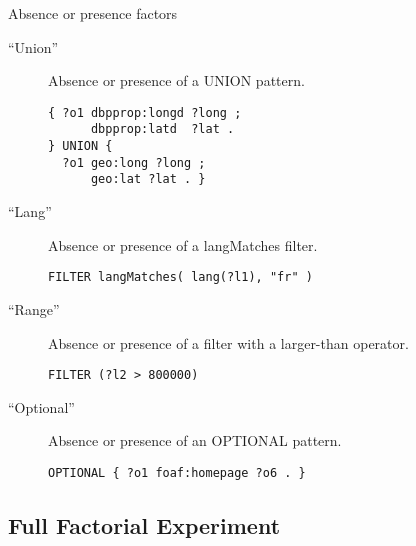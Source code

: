 \documentclass[english,handout,aspectratio=169]{ifislide}
\begin{document}
\begin{frame}[fragile]{Absence or presence factors}
  \begin{description}
  \item [``Union''] Absence or presence of a \textsf{UNION} pattern.

    \begin{verbatim}
{ ?o1 dbpprop:longd ?long ;
      dbpprop:latd  ?lat .
} UNION {
  ?o1 geo:long ?long ;
      geo:lat ?lat . }
\end{verbatim} 

  \item [``Lang''] Absence or presence of a \textsf{langMatches}
    filter.

\begin{verbatim}
FILTER langMatches( lang(?l1), "fr" ) 
\end{verbatim} 


  \item [``Range''] Absence or presence of a filter with a larger-than
    operator.

    \begin{verbatim}
FILTER (?l2 > 800000)
\end{verbatim} 

  \item [``Optional''] Absence or presence of an \textsf{OPTIONAL}
    pattern.
    \begin{verbatim}
OPTIONAL { ?o1 foaf:homepage ?o6 . }
\end{verbatim} 

  \end{description}
\end{frame}

\subsection{Full Factorial Experiment}
\end{document}
